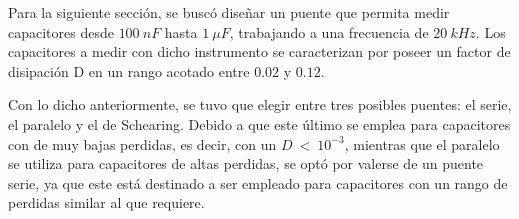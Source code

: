 



Para la siguiente sección, se buscó diseñar un puente que permita medir capacitores desde $100 \ nF$ hasta $1 \ \mu F$, trabajando a una frecuencia de $20 \ kHz$. Los capacitores a medir con dicho instrumento se caracterizan por poseer un factor de disipación D en un rango acotado entre $0.02$ y $0.12$.

Con lo dicho anteriormente, se tuvo que elegir entre tres posibles puentes: el serie, el paralelo y el de Schearing. Debido a que este último se emplea para capacitores con de muy bajas perdidas, es decir, con un $D \ < \ 10^{-3}$, mientras que el paralelo se utiliza para capacitores de altas perdidas, se optó por valerse de un puente serie, ya que este está destinado a ser empleado para capacitores con un rango de perdidas similar al que requiere.
